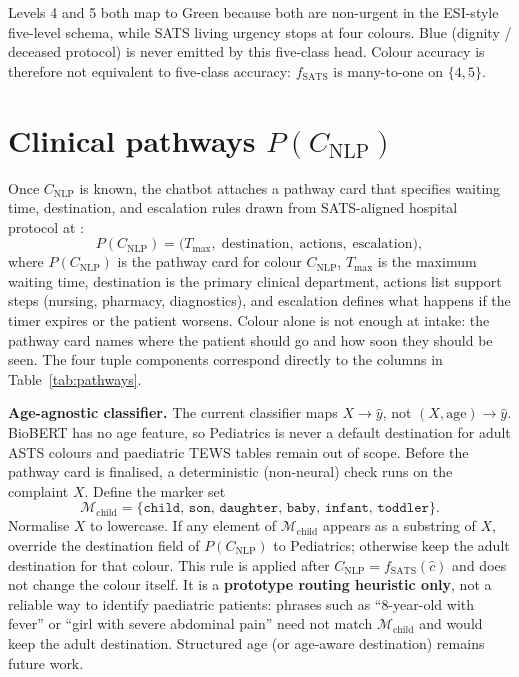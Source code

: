 Levels 4 and 5 both map to Green because both are non-urgent in the ESI-style five-level schema, while SATS living urgency stops at four colours. Blue (dignity / deceased protocol) is never emitted by this five-class head. Colour accuracy is therefore not equivalent to five-class accuracy: \(f_{\mathrm{SATS}}\) is many-to-one on \(\{4,5\}\).

\section{Clinical pathways \(P(C_{\mathrm{NLP}})\)}
\label{sec:pathways}

Once \(C_{\mathrm{NLP}}\) is known, the chatbot attaches a pathway card that specifies waiting time, destination, and escalation rules drawn from SATS-aligned hospital protocol at \examplehospital{}:
\begin{equation}
  P(C_{\mathrm{NLP}}) = \bigl(T_{\max},\; \text{destination},\; \text{actions},\; \text{escalation}\bigr),
\end{equation}
where \(P(C_{\mathrm{NLP}})\) is the pathway card for colour \(C_{\mathrm{NLP}}\), \(T_{\max}\) is the maximum waiting time, destination is the primary clinical department, actions list support steps (nursing, pharmacy, diagnostics), and escalation defines what happens if the timer expires or the patient worsens. Colour alone is not enough at intake: the pathway card names where the patient should go and how soon they should be seen. The four tuple components correspond directly to the columns in Table~\ref{tab:pathways}.

\textbf{Age-agnostic classifier.} The current classifier maps \(X\to\hat{y}\), not \((X,\mathrm{age})\to\hat{y}\). BioBERT has no age feature, so Pediatrics is never a default destination for adult ASTS colours and paediatric TEWS tables remain out of scope. Before the pathway card is finalised, a deterministic (non-neural) check runs on the complaint \(X\). Define the marker set
\begin{equation}
  \mathcal{M}_{\mathrm{child}}=\{\texttt{child},\,\texttt{son},\,\texttt{daughter},\,\texttt{baby},\,\texttt{infant},\,\texttt{toddler}\}.
\end{equation}
Normalise \(X\) to lowercase. If any element of \(\mathcal{M}_{\mathrm{child}}\) appears as a substring of \(X\), override the destination field of \(P(C_{\mathrm{NLP}})\) to Pediatrics; otherwise keep the adult destination for that colour. This rule is applied after \(C_{\mathrm{NLP}}=f_{\mathrm{SATS}}(\hat{c})\) and does not change the colour itself. It is a \textbf{prototype routing heuristic only}, not a reliable way to identify paediatric patients: phrases such as ``8-year-old with fever'' or ``girl with severe abdominal pain'' need not match \(\mathcal{M}_{\mathrm{child}}\) and would keep the adult destination. Structured age (or age-aware destination) remains future work.


